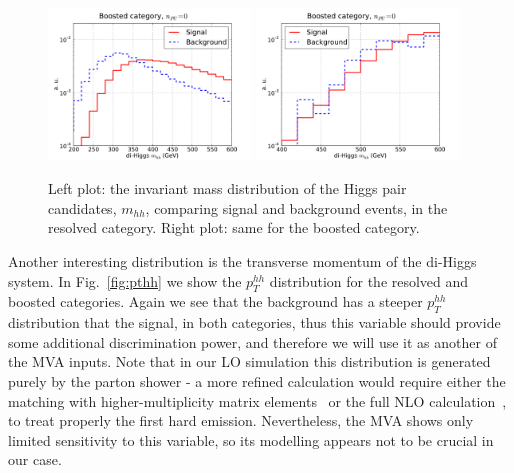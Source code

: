 \begin{figure}[t]
\begin{center}
  \includegraphics[width=0.48\textwidth]{plots/m_HH_C2_res_noPU.pdf}
  \includegraphics[width=0.48\textwidth]{plots/m_HH_C2_bst_noPU.pdf}
  \caption{\small Left plot: the invariant mass distribution of the Higgs
    pair candidates, $m_{hh}$, comparing signal and background events,
    in the resolved category.
    Right plot: same for the boosted category.
}
\label{fig:mhh}
\end{center}
\end{figure}


Another interesting distribution is the transverse momentum of
the di-Higgs system.
%
In Fig.~\ref{fig:pthh} we show the $p_T^{hh}$
distribution
for the resolved and boosted categories.
%
Again we see that the background has a steeper $p_T^{hh}$ distribution
that the signal, in both categories, thus this variable
should provide some additional discrimination power, and therefore
we will use it as another of the MVA inputs.
%
Note that in our LO simulation this distribution is generated purely
by the parton shower - a more refined calculation would require
either the matching with higher-multiplicity matrix elements~\cite{Maierhofer:2013sha} or
the full NLO calculation~\cite{Frederix:2014hta}, to treat properly the first hard emission.
%
Nevertheless, the MVA shows only limited sensitivity to this variable, so its
modelling appears not to be crucial in our case.

